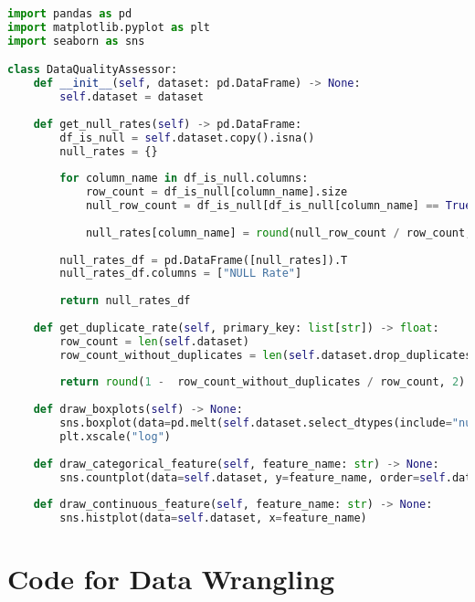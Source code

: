 \documentclass[sigconf]{acmart}
\begin{document}



\begin{lstlisting}[language=Python]
import pandas as pd
import matplotlib.pyplot as plt
import seaborn as sns

class DataQualityAssessor:
    def __init__(self, dataset: pd.DataFrame) -> None:
        self.dataset = dataset
        
    def get_null_rates(self) -> pd.DataFrame:
        df_is_null = self.dataset.copy().isna()
        null_rates = {}
        
        for column_name in df_is_null.columns:
            row_count = df_is_null[column_name].size
            null_row_count = df_is_null[df_is_null[column_name] == True][column_name].size
            
            null_rates[column_name] = round(null_row_count / row_count, 2)
            
        null_rates_df = pd.DataFrame([null_rates]).T
        null_rates_df.columns = ["NULL Rate"]
            
        return null_rates_df
    
    def get_duplicate_rate(self, primary_key: list[str]) -> float:
        row_count = len(self.dataset)
        row_count_without_duplicates = len(self.dataset.drop_duplicates(subset=primary_key))
        
        return round(1 -  row_count_without_duplicates / row_count, 2)
    
    def draw_boxplots(self) -> None:
        sns.boxplot(data=pd.melt(self.dataset.select_dtypes(include="number")), x="value", y="variable")
        plt.xscale("log")
        
    def draw_categorical_feature(self, feature_name: str) -> None:
        sns.countplot(data=self.dataset, y=feature_name, order=self.dataset[feature_name].value_counts().index)
        
    def draw_continuous_feature(self, feature_name: str) -> None:
        sns.histplot(data=self.dataset, x=feature_name)
\end{lstlisting}

\section{Code for Data Wrangling}
\end{document}
